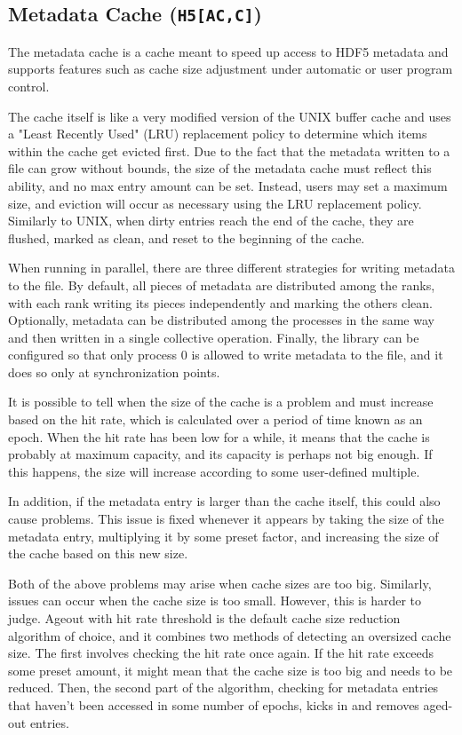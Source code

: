 \subsection{Metadata Cache (\texttt{H5[AC,C]})}


The metadata cache is a cache meant to speed up access to HDF5 metadata and supports features such as cache size adjustment under automatic or user program control. 

The cache itself is like a very modified version of the UNIX buffer cache and uses a "Least Recently Used" (LRU) replacement policy to determine which items within the cache get evicted first. Due to the fact that the metadata written to a file can grow without bounds, the size of the metadata cache must reflect this ability, and no max entry amount can be set. Instead, users may set a maximum size, and eviction will occur as necessary using the LRU replacement policy. Similarly to UNIX, when dirty entries reach the end of the cache, they are flushed, marked as clean, and reset to the beginning of the cache.

When running in parallel, there are three different strategies for writing metadata to the file. By default, all pieces of metadata are distributed among the ranks, with each rank writing its pieces independently and marking the others clean. Optionally, metadata can be distributed among the processes in the same way and then written in a single collective operation. Finally, the library can be configured so that only process 0 is allowed to write metadata to the file, and it does so only at synchronization points.

It is possible to tell when the size of the cache is a problem and must increase based on the hit rate, which is calculated over a period of time known as an epoch. When the hit rate has been low for a while, it means that the cache is probably at maximum capacity, and its capacity is perhaps not big enough. If this happens, the size will increase according to some user-defined multiple. 

In addition, if the metadata entry is larger than the cache itself, this could also cause problems. This issue is fixed whenever it appears by taking the size of the metadata entry, multiplying it by some preset factor, and increasing the size of the cache based on this new size. 

Both of the above problems may arise when cache sizes are too big. Similarly, issues can occur when the cache size is too small. However, this is harder to judge. Ageout with hit rate threshold is the default cache size reduction algorithm of choice, and it combines two methods of detecting an oversized cache size. The first involves checking the hit rate once again. If the hit rate exceeds some preset amount, it might mean that the cache size is too big and needs to be reduced. Then, the second part of the algorithm, checking for metadata entries that haven't been accessed in some number of epochs, kicks in and removes aged-out entries. 

